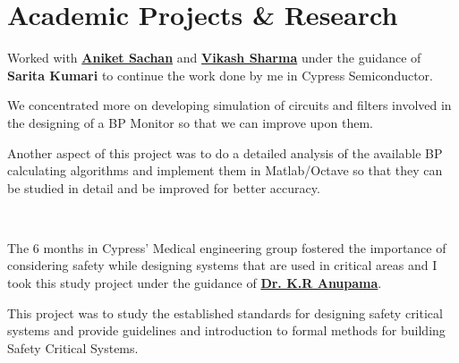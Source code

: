 \documentclass[letterpaper]{deedy-resume} %
\begin{document}
\begin{minipage}[t]{0.66\textwidth} %


\section{Academic Projects \& Research}


\vspace{\topsep} %
\begin{tightitemize}
\item Worked with \textbf{\href{http://in.linkedin.com/in/aniketsachan}{Aniket Sachan}} and \textbf{\href{http://in.linkedin.com/pub/vikash-sharma/16/865/aba}{Vikash Sharma}} under the guidance of \textbf{Sarita Kumari} to continue the work done by me in Cypress Semiconductor.
\item We concentrated more on developing simulation of circuits and filters involved in the designing of a BP Monitor so that we can improve upon them.
\item Another aspect of this project was to do a detailed analysis of the available BP calculating algorithms and implement them in Matlab/Octave so that they can be studied in detail and be improved for better accuracy.
\end{tightitemize}

\sectionspace %


 \\
\begin{tightitemize}
\item The 6 months in Cypress' Medical engineering group fostered the importance of considering safety while designing systems that are used in critical areas and I took this study project under the guidance of \textbf{\href{http://universe.bits-pilani.ac.in/goa/anupkr/profile}{Dr. K.R Anupama}}.
\item This project was to study the established standards for designing safety critical systems and provide guidelines and introduction to formal methods for building Safety Critical Systems.
\end{tightitemize}


\end{minipage}
\end{document}
